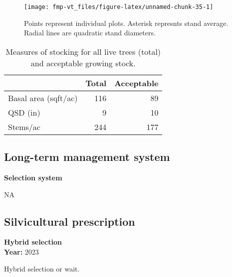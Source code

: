\documentclass[]{tufte-handout}
\begin{document}
\begin{figure}
\texttt{[image: fmp-vt\_files/figure-latex/unnamed-chunk-35-1]} \caption[Points represent individual plots]{Points represent individual plots. Asterisk represnts stand average. Radial lines are quadratic stand diameters.}\label{fig:unnamed-chunk-35}
\end{figure}

\begin{table}

\caption{\label{tab:unnamed-chunk-36}Measures of stocking for all live trees (total) and acceptable growing stock.}
\centering
\begin{tabular}[t]{lrr}
\toprule
  & Total & Acceptable\\
\midrule
Basal area (sqft/ac) & 116 & 89\\
QSD (in) & 9 & 10\\
Stems/ac & 244 & 177\\
\bottomrule
\end{tabular}
\end{table}

\subsection{Long-term management
system}\label{long-term-management-system-6}

\textbf{Selection system}

NA

\subsection{Silvicultural
prescription}\label{silvicultural-prescription-6}

\textbf{Hybrid selection}\\
\noindent \textbf{Year:} 2023

Hybrid selection or wait.

\newpage
\end{document}
